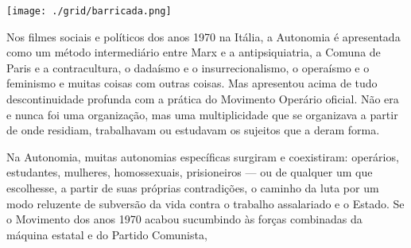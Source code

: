 \pagebreak %

\begin{center}
\hspace*{-3.6cm}
\hspace*{3.1cm}\texttt{[image: ./grid/barricada.png]}
\end{center}

\hspace*{-7cm}\hrulefill\hspace*{-7cm}

\medskip

\noindent{}Nos filmes sociais e políticos dos anos 1970 na Itália, a Autonomia é apresentada como um método intermediário entre Marx e a antipsiquiatria, a Comuna de Paris e a contracultura, o dadaísmo e o insurrecionalismo, o operaísmo e o feminismo e muitas coisas com outras coisas. Mas apresentou acima de tudo descontinuidade profunda com a prática do Movimento Operário oficial. Não era e nunca foi uma organização, mas uma multiplicidade que se organizava a partir de onde residiam, trabalhavam ou estudavam os sujeitos que a deram forma.

Na Autonomia, muitas autonomias específicas surgiram e coexistiram: operários, estudantes, mulheres, homossexuais, prisioneiros --- ou de qualquer um que escolhesse, a partir de suas próprias contradições, o caminho da luta por um modo reluzente de subversão da vida contra o trabalho assalariado e o Estado. Se o Movimento dos anos 1970 acabou sucumbindo às forças combinadas da máquina estatal e do Partido Comunista,  

\vfill

\hspace*{-.4cm}\begin{minipage}[c]{1\linewidth}
\small{
{}}
\end{minipage}


